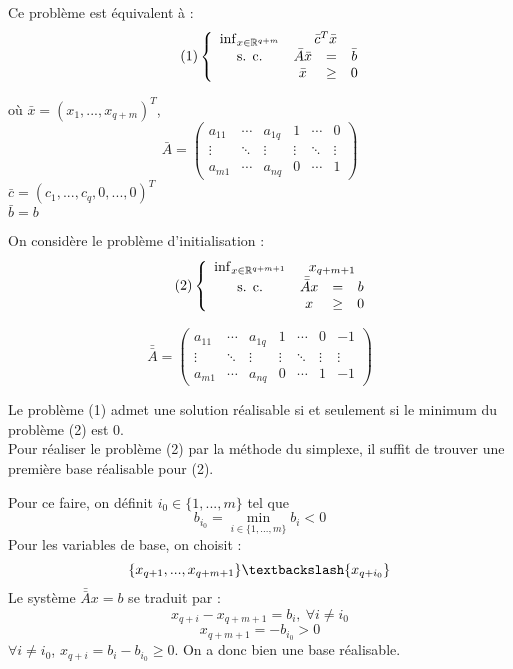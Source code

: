 Ce problème est équivalent à :
\begin{equation} \tag{1} \left\{ \begin{array}{c c c c} \inf_{x\in\mathbb{R}^{q+m}} & \multicolumn{3}{c}{\bar{c}^T\bar{x}} \\
						\text{s. c.}     & \bar{A}\bar{x} &=& \bar{b} \\
								& \bar{x} &\geq& 0
	\end{array} \right.\end{equation}

où $\bar{x}=(x_1,...,x_{q+m})^T$, \[\bar{A}=\begin{pmatrix} a_{11} & \cdots & a_{1q} & 1 & \cdots & 0 \\
							    \vdots & \ddots & \vdots & \vdots & \ddots & \vdots \\
							    a_{m1} & \cdots & a_{nq} & 0 & \cdots & 1 \end{pmatrix}\]
$\bar{c}=(c_1,...,c_q,0,...,0)^T$\\
$\bar{b}=b$

On considère le problème d'initialisation :
\begin{equation} \tag{2} \left\{ \begin{array}{c c c c} \inf_{x\in\mathbb{R}^{q+m+1}} & \multicolumn{3}{c}{x_{q+m+1}} \\
						\text{s. c.}     & \bar{\bar{A}}x &=& b \\
								& x &\geq& 0
	\end{array} \right.\end{equation}

\[\bar{\bar{A}}=\begin{pmatrix} a_{11} & \cdots & a_{1q} & 1 & \cdots & 0 & -1\\
				\vdots & \ddots & \vdots & \vdots & \ddots & \vdots & \vdots\\
				a_{m1} & \cdots & a_{nq} & 0 & \cdots & 1 & -1\end{pmatrix}\]

Le problème (1) admet une solution réalisable si et seulement si le minimum du problème (2) est 0.\\
Pour réaliser le problème (2) par la méthode du simplexe, il suffit de trouver une première base réalisable pour (2).

\bigskip
Pour ce faire, on définit $i_0\in\{1,...,m\}$ tel que \[b_{i_0}=\min_{i\in\{1,...,m\}} b_i<0\]
Pour les variables de base, on choisit : \[\{x_{q+1},...,x_{q+m+1}\}\textbackslash\{x_{q+i_0}\}\]
Le système $\bar{\bar{A}}x=b$ se traduit par :
	\[x_{q+i}-x_{q+m+1}=b_i,\ \forall i\neq i_0\]
	\[x_{q+m+1}=-b_{i_0}>0\]
$\forall i\neq i_0$, $x_{q+i}=b_i-b_{i_0}\geq 0$. On a donc bien une base réalisable.

